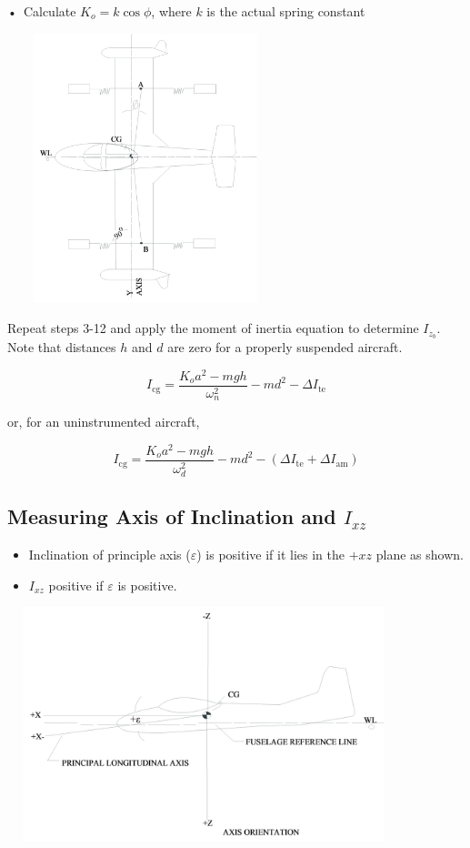 \documentclass[
]{book}
\providecommand{\tightlist}{%
  \setlength{\itemsep}{0pt}\setlength{\parskip}{0pt}}
\begin{document}
•~Calculate \(K_o = k \cos{\phi}\), where \(k\) is the actual spring constant

\includegraphics[width=3.15625in,height=3.08333in]{media/07/image38.svg}

Repeat steps 3-12 and apply the moment of inertia equation to determine \(I_{z_b}\). Note that distances \(h\) and \(d\) are zero for a properly suspended aircraft.

\[ I_{\mathrm{cg}} = \frac{K_o a^2 - mgh}{\omega_n^2} - md^2 - \Delta I_{\mathrm{te}} \]

or, for an uninstrumented aircraft,

\[ I_{\mathrm{cg}} = \frac{K_o a^2 - mgh}{\omega_d^2} - md^2 - \left(\Delta I_{\mathrm{te}} + \Delta I_{\mathrm{am}} \right) \]

\hypertarget{measuring-axis-of-inclination-and-i_xz}{%
\subsection{\texorpdfstring{Measuring Axis of Inclination and \(I_{xz}\)}{Measuring Axis of Inclination and I\_\{xz\}}}\label{measuring-axis-of-inclination-and-i_xz}}

\begin{itemize}
\tightlist
\item
  Inclination of principle axis (\(\varepsilon\)) is positive if it lies in the \(+xz\) plane as shown.
\item
  \(I_{xz}\) positive if \(\varepsilon\) is positive.
\end{itemize}

\includegraphics[width=4.5in,height=2.67708in]{media/07/image41.svg}
\end{document}
